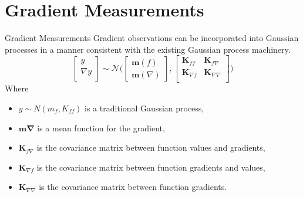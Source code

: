 \documentclass{beamer}
\begin{document}
\section{Gradient Measurements}
\begin{frame}{Gradient Measurements}
Gradient observations can be incorporated into Gaussian processes in a manner consistent with the existing Gaussian process machinery.
\begin{equation*}
    \begin{bmatrix} 
    y\\
    \nabla y\\
    \end{bmatrix}
    \sim \mathcal{N}\bigg(
    \begin{bmatrix}
    \boldsymbol{m}(f) \\
    \boldsymbol{m}(\nabla)
    \end{bmatrix},
    \begin{bmatrix}
    \boldsymbol{K}_{ff}  & \boldsymbol{K}_{f\nabla}\\
    \boldsymbol{K}_{\nabla f}    & \boldsymbol{K}_{\nabla \nabla}\\
    \end{bmatrix}
    \bigg)
\end{equation*}
Where
\begin{itemize}
    \item  $y\sim N(m_f, K_{ff})$ is a traditional Gaussian process, 
    \item $\boldsymbol{m\nabla}$ is a mean function for the gradient,
    \item $\boldsymbol{K}_{f\nabla}$ is the covariance matrix between function values and gradients, 
    \item $\boldsymbol{K}_{\nabla f}$ is the covariance matrix between function gradients and values, 
    \item $\boldsymbol{K}_{\nabla \nabla}$ is the covariance matrix between function gradients.
\end{itemize}
\end{frame}
\end{document}
